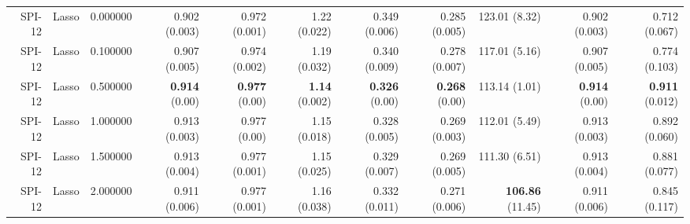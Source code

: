 \begin{table}
\begin{tabular}{rrrrrrrrrrr}
SPI-12 & Lasso & 0.000000 & 0.902 (0.003) & 0.972 (0.001) & 1.22 (0.022) & 0.349 (0.006) & 0.285 (0.005) & 123.01 (8.32) & 0.902 (0.003) & 0.712 (0.067) \\
SPI-12 & Lasso & 0.100000 & 0.907 (0.005) & 0.974 (0.002) & 1.19 (0.032) & 0.340 (0.009) & 0.278 (0.007) & 117.01 (5.16) & 0.907 (0.005) & 0.774 (0.103) \\
SPI-12 & Lasso & 0.500000 & { \bf 0.914} (0.00) & { \bf 0.977} (0.00) & { \bf 1.14} (0.002) & { \bf 0.326} (0.00) & { \bf 0.268} (0.00) & 113.14 (1.01) & { \bf 0.914} (0.00) & { \bf 0.911} (0.012) \\
SPI-12 & Lasso & 1.000000 & 0.913 (0.003) & 0.977 (0.00) & 1.15 (0.018) & 0.328 (0.005) & 0.269 (0.003) & 112.01 (5.49) & 0.913 (0.003) & 0.892 (0.060) \\
SPI-12 & Lasso & 1.500000 & 0.913 (0.004) & 0.977 (0.001) & 1.15 (0.025) & 0.329 (0.007) & 0.269 (0.005) & 111.30 (6.51) & 0.913 (0.004) & 0.881 (0.077) \\
SPI-12 & Lasso & 2.000000 & 0.911 (0.006) & 0.977 (0.001) & 1.16 (0.038) & 0.332 (0.011) & 0.271 (0.006) & { \bf 106.86} (11.45) & 0.911 (0.006) & 0.845 (0.117) \\
\bottomrule
\end{tabular}
\end{table}
